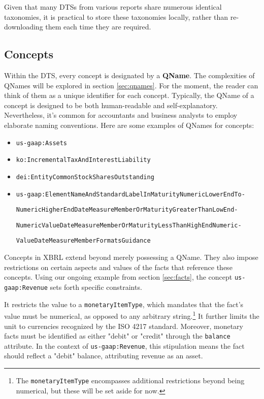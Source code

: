 Given that many DTSs from various reports share numerous identical taxonomies, it is practical to store these taxonomies locally,
rather than re-downloading them each time they are required.

\subsection{Concepts}

Within the DTS, every concept is designated by a \textbf{QName}.
The complexities of QNames will be explored in section \ref{sec:qnames}. 
For the moment, the reader can think of them as a unique identifier for each concept.
Typically, the QName of a concept is designed to be both human-readable and self-explanatory.
Nevertheless, it's common for accountants and business analysts to employ elaborate naming conventions.
Here are some examples of QNames for concepts:

\begin{itemize}
    \item \texttt{us-gaap:Assets}
    \item \texttt{ko:IncrementalTaxAndInterestLiability}
    \item \texttt{dei:EntityCommonStockSharesOutstanding}
    \item \texttt{us-gaap:ElementNameAndStandardLabelInMaturityNumericLowerEndTo-} 
    
    \texttt{NumericHigherEndDateMeasureMemberOrMaturityGreaterThanLowEnd-}
    
    \texttt{NumericValueDateMeasureMemberOrMaturityLessThanHighEndNumeric-}
    
    \texttt{ValueDateMeasureMemberFormatsGuidance}
\end{itemize}

Concepts in XBRL extend beyond merely possessing a QName.
They also impose restrictions on certain aspects and values of the facts that reference these concepts.
Using our ongoing example from section \ref{sec:facts}, the concept \texttt{us-gaap:Revenue} sets forth specific constraints.

It restricts the value to a \texttt{monetaryItemType},
which mandates that the fact's value must be numerical,
as opposed to any arbitrary string.\footnote{The \texttt{monetaryItemType} encompasses additional restrictions beyond being numerical, but these will be set aside for now.}
It further limits the unit to currencies recognized by the ISO 4217 standard.\cite{eba2018filingrules}
Moreover, monetary facts must be identified as either "debit" or "credit" through the \texttt{balance} attribute.
In the context of \texttt{us-gaap:Revenue}, this stipulation means the fact should reflect a "debit" balance, attributing revenue as an asset.

